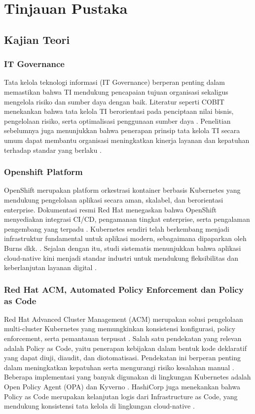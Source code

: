 \chapter{Tinjauan Pustaka}
\section{Kajian Teori}

\subsection{IT Governance}
Tata kelola teknologi informasi (IT Governance) berperan penting dalam memastikan bahwa TI mendukung pencapaian tujuan organisasi sekaligus mengelola risiko dan sumber daya dengan baik. Literatur seperti COBIT menekankan bahwa tata kelola TI berorientasi pada penciptaan nilai bisnis, pengelolaan risiko, serta optimalisasi penggunaan sumber daya \cite{isaca2012cobit5} \cite{itgi2007cobit41}. Penelitian sebelumnya juga menunjukkan bahwa penerapan prinsip tata kelola TI secara umum dapat membantu organisasi meningkatkan kinerja layanan dan kepatuhan terhadap standar yang berlaku \cite{catersteel2005itgov}.

\subsection{Openshift Platform}
OpenShift merupakan platform orkestrasi kontainer berbasis Kubernetes yang mendukung pengelolaan aplikasi secara aman, skalabel, dan berorientasi enterprise. Dokumentasi resmi Red Hat menegaskan bahwa OpenShift menyediakan integrasi CI/CD, pengamanan tingkat enterprise, serta pengalaman pengembang yang terpadu \cite{redhat2022openshift}. Kubernetes sendiri telah berkembang menjadi infrastruktur fundamental untuk aplikasi modern, sebagaimana dipaparkan oleh Burns dkk. \cite{burns2021kubernetes}. Sejalan dengan itu, studi sistematis menunjukkan bahwa aplikasi cloud-native kini menjadi standar industri untuk mendukung fleksibilitas dan keberlanjutan layanan digital \cite{kratzke2017cloudnative}.

\subsection{Red Hat ACM, Automated Policy Enforcement dan Policy as Code}
Red Hat Advanced Cluster Management (ACM) merupakan solusi pengelolaan multi-cluster Kubernetes yang memungkinkan konsistensi konfigurasi, policy enforcement, serta pemantauan terpusat \cite{redhat2023acm}. Salah satu pendekatan yang relevan adalah Policy as Code, yaitu penerapan kebijakan dalam bentuk kode deklaratif yang dapat diuji, diaudit, dan diotomatisasi. Pendekatan ini berperan penting dalam meningkatkan kepatuhan serta mengurangi risiko kesalahan manual \cite{torstensson2021policyascode}. Beberapa implementasi yang banyak digunakan di lingkungan Kubernetes adalah Open Policy Agent (OPA) \cite{opa2022docs} dan Kyverno \cite{kyverno2023docs}. HashiCorp juga menekankan bahwa Policy as Code merupakan kelanjutan logis dari Infrastructure as Code, yang mendukung konsistensi tata kelola di lingkungan cloud-native \cite{hashicorp2020policyascode}.

